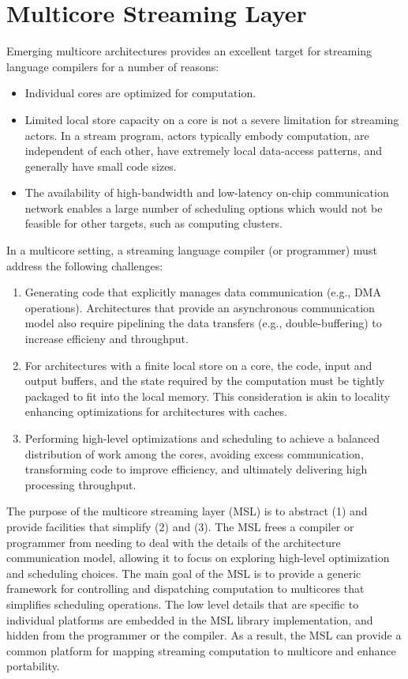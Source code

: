\section{Multicore Streaming Layer}\label{ch:lib}

Emerging multicore architectures provides an excellent target for
streaming language compilers for a number of reasons:
\begin{itemize}
\item Individual cores are optimized for computation.
\item Limited local store capacity on a core is not a severe
limitation for streaming actors. In a stream program, actors typically
embody computation, are independent of each other, have extremely
local data-access patterns, and generally have small code sizes.
\item The availability of high-bandwidth and low-latency on-chip
communication network enables a large number of scheduling options
which would not be feasible for other targets, such as computing
clusters.
\end{itemize}

In a multicore setting, a streaming language compiler (or programmer)
must address the following challenges:
\begin{enumerate}
\item Generating code that explicitly manages data communication
  (e.g., DMA operations). Architectures that provide an asynchronous
  communication model also require pipelining the data transfers (e.g.,
  double-buffering) to increase efficieny and throughput.
\item For architectures with a finite local store on a core, the code,
  input and output buffers, and the state required by the computation
  must be tightly packaged to fit into the local memory. This
  consideration is akin to locality enhancing optimizations for
  architectures with caches.
\item Performing high-level optimizations and scheduling to achieve a
  balanced distribution of work among the cores, avoiding excess
  communication, transforming code to improve efficiency, and
  ultimately delivering high processing throughput.
\end{enumerate}

The purpose of the multicore streaming layer (MSL) is to abstract
\textsf{(1)} and provide facilities that simplify \textsf{(2)} and
\textsf{(3)}. The MSL frees a compiler or programmer from needing to
deal with the details of the architecture communication model,
allowing it to focus on exploring high-level optimization and
scheduling choices. The main goal of the MSL is to provide a generic
framework for controlling and dispatching computation to multicores
that simplifies scheduling operations. The low level details that are
specific to individual platforms are embedded in the MSL library
implementation, and hidden from the programmer or the compiler. As a
result, the MSL can provide a common platform for mapping streaming
computation to multicore and enhance portability.
